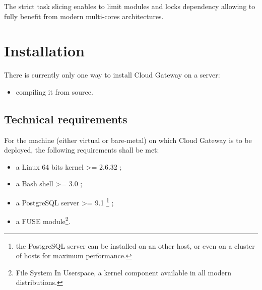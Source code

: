 \documentclass[11pt,fleqn,openany]{book} %
\begin{document}
The strict task slicing enables to limit modules and locks dependency allowing to fully benefit from modern multi-cores architectures.\\

\cleardoublepage %

\chapter{Installation}
\label{chap:installation}

There is currently only one way to install Cloud Gateway on a server:\\
\begin{itemize}
\item compiling it from source.\\
\end{itemize}


\section{Technical requirements}
\label{sec:technical-requirements}

For the machine (either virtual or bare-metal) on which Cloud Gateway is to be deployed, the following requirements shall be met:\\
\begin{itemize}
\item a Linux 64 bits kernel >= 2.6.32 ;
\item a Bash shell >= 3.0 ;
\item a PostgreSQL server >= 9.1 \footnote{the PostgreSQL server can be installed on an other host, or even on a cluster of hosts for maximum performance.} ;
\item a FUSE module\footnote{File System In Userspace, a kernel component available in all modern distributions.}.\\
\end{itemize}
\end{document}
